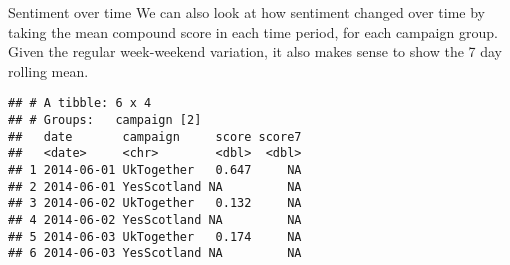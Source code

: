 \documentclass[
  10pt,
  ignorenonframetext,
  aspectratio=169]{beamer}
\newenvironment{Shaded}{\begin{snugshade}}{\end{snugshade}}
\newcommand{\AttributeTok}[1]{\textcolor[rgb]{0.80,0.80,0.80}{#1}}
\newcommand{\DecValTok}[1]{\textcolor[rgb]{0.86,0.86,0.80}{#1}}
\newcommand{\FunctionTok}[1]{\textcolor[rgb]{0.94,0.94,0.56}{#1}}
\newcommand{\NormalTok}[1]{\textcolor[rgb]{0.80,0.80,0.80}{#1}}
\newcommand{\OtherTok}[1]{\textcolor[rgb]{0.94,0.94,0.56}{#1}}
\newcommand{\SpecialCharTok}[1]{\textcolor[rgb]{0.86,0.64,0.64}{#1}}
\newcommand{\StringTok}[1]{\textcolor[rgb]{0.80,0.58,0.58}{#1}}
\begin{document}
\begin{frame}[fragile]{Sentiment over time}
\protect\hypertarget{sentiment-over-time}{}
We can also look at how sentiment changed over time by taking the mean
compound score in each time period, for each campaign group. Given the
regular week-weekend variation, it also makes sense to show the 7 day
rolling mean.

\medskip
\scriptsize

\begin{Shaded}
\end{Shaded}

\begin{verbatim}
## # A tibble: 6 x 4
## # Groups:   campaign [2]
##   date       campaign     score score7
##   <date>     <chr>        <dbl>  <dbl>
## 1 2014-06-01 UkTogether   0.647     NA
## 2 2014-06-01 YesScotland NA         NA
## 3 2014-06-02 UkTogether   0.132     NA
## 4 2014-06-02 YesScotland NA         NA
## 5 2014-06-03 UkTogether   0.174     NA
## 6 2014-06-03 YesScotland NA         NA
\end{verbatim}
\end{frame}
\end{document}
